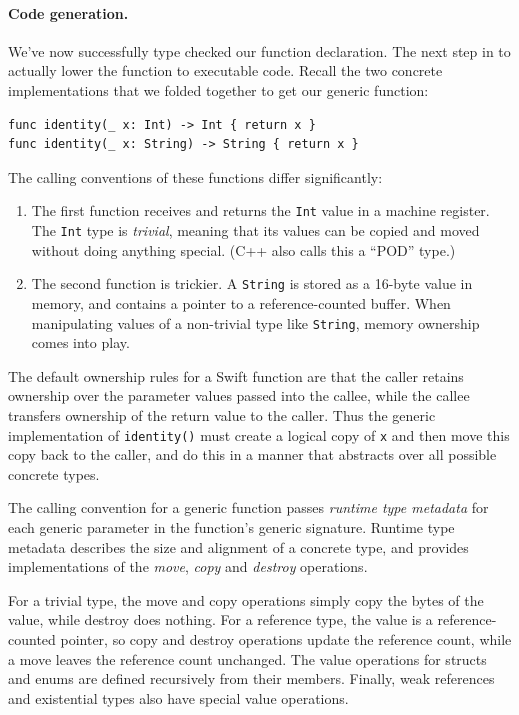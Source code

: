 \documentclass[../generics]{subfiles}
\begin{document}
\paragraph{Code generation.}
We've now successfully type checked our function declaration. The next step in to actually lower the function to executable code. Recall the two concrete implementations that we folded together to get our generic function:
\begin{Verbatim}
func identity(_ x: Int) -> Int { return x }
func identity(_ x: String) -> String { return x }
\end{Verbatim}
The calling conventions of these functions differ significantly:
\begin{enumerate}
\item The first function receives and returns the \texttt{Int} value in a machine register. The \texttt{Int} type is \emph{trivial}, meaning that its values can be copied and moved without doing anything special. (C++ also calls this a ``POD'' type.)
\item The second function is trickier. A \texttt{String} is stored as a 16-byte value in memory, and contains a pointer to a reference-counted buffer. When manipulating values of a non-trivial type like \texttt{String}, memory ownership comes into play.
\end{enumerate}

The default ownership rules for a Swift function are that the caller retains ownership over the parameter values passed into the callee, while the callee transfers ownership of the return value to the caller. Thus the generic implementation of \verb|identity()| must create a logical copy of \texttt{x} and then move this copy back to the caller, and do this in a manner that abstracts over all possible concrete types.

The calling convention for a generic function passes \emph{runtime type metadata} for each generic parameter in the function's generic signature. Runtime type metadata describes the size and alignment of a concrete type, and provides implementations of the \emph{move}, \emph{copy} and \emph{destroy} operations.

For a trivial type, the move and copy operations simply copy the bytes of the value, while destroy does nothing. For a reference type, the value is a reference-counted pointer, so copy and destroy operations update the reference count, while a move leaves the reference count unchanged. The value operations for structs and enums are defined recursively from their members. Finally, weak references and existential types also have special value operations.
\end{document}
